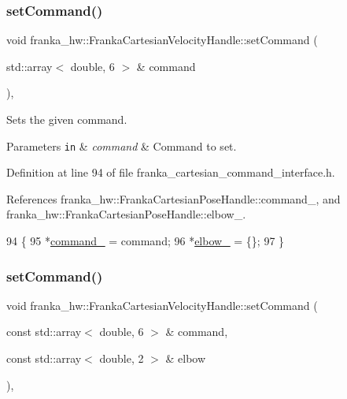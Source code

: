 \subsubsection{\texorpdfstring{set\+Command()}{setCommand()}\hspace{0.1cm}{\footnotesize\ttfamily [1/2]}}
{\footnotesize\ttfamily void franka\+\_\+hw\+::\+Franka\+Cartesian\+Velocity\+Handle\+::set\+Command (\begin{DoxyParamCaption}\item[{std\+::array$<$ double, 6 $>$ \&}]{command }\end{DoxyParamCaption})\hspace{0.3cm}{\ttfamily [inline]}, {\ttfamily [noexcept]}}

Sets the given command.


\begin{DoxyParams}[1]{Parameters}
\mbox{\tt in}  & {\em command} & Command to set. \\
\hline
\end{DoxyParams}


Definition at line 94 of file franka\+\_\+cartesian\+\_\+command\+\_\+interface.\+h.



References franka\+\_\+hw\+::\+Franka\+Cartesian\+Pose\+Handle\+::command\+\_\+, and franka\+\_\+hw\+::\+Franka\+Cartesian\+Pose\+Handle\+::elbow\+\_\+.


\begin{DoxyCode}
94                                                          \{
95     *\hyperlink{classfranka__hw_1_1FrankaCartesianVelocityHandle_a625da5bae348f94d3fc1fbc09a432f40}{command\_} = command;
96     *\hyperlink{classfranka__hw_1_1FrankaCartesianVelocityHandle_a94e376a17a17c473b9ad4168bcbc5e61}{elbow\_} = \{\};
97   \}
\end{DoxyCode}
\mbox{\label{classfranka__hw_1_1FrankaCartesianVelocityHandle_aaf139dd23a7d9784a7cc74c6eaca4b9c}} 
\subsubsection{\texorpdfstring{set\+Command()}{setCommand()}\hspace{0.1cm}{\footnotesize\ttfamily [2/2]}}
{\footnotesize\ttfamily void franka\+\_\+hw\+::\+Franka\+Cartesian\+Velocity\+Handle\+::set\+Command (\begin{DoxyParamCaption}\item[{const std\+::array$<$ double, 6 $>$ \&}]{command,  }\item[{const std\+::array$<$ double, 2 $>$ \&}]{elbow }\end{DoxyParamCaption})\hspace{0.3cm}{\ttfamily [inline]}, {\ttfamily [noexcept]}}

